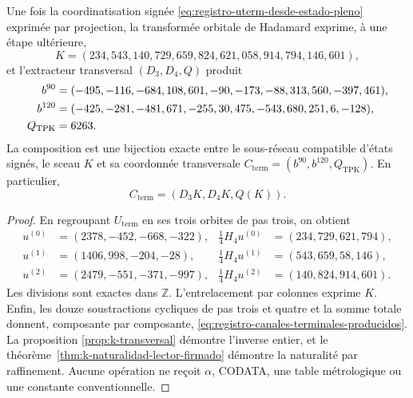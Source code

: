 \begin{theorem}
\label{thm:registro-evaluacion-terminal-recuperada}
Une fois la coordinatisation signée \eqref{eq:registro-uterm-desde-estado-pleno} exprimée par projection, la transformée orbitale de Hadamard exprime, à une étape ultérieure,
\[
 K=(234,543,140,729,659,824,621,058,914,794,146,601),
\]
et l’extracteur transversal \((D_3,D_4,Q)\) produit
\begin{align}
 b^{90}={}&(-495,-116,-684,108,601,-90,
             -173,-88,313,560,-397,461),\notag\\
 b^{120}={}&(-425,-281,-481,671,-255,30,
              475,-543,680,251,6,-128),\notag\\
 Q_{\mathrm{TPK}}={}&6263.
 \label{eq:registro-canales-terminales-producidos}
\end{align}
La composition est une bijection exacte entre le sous-réseau compatible d'états signés, le sceau \(K\) et sa coordonnée transversale \(C_{\mathrm{term}}=(b^{90},b^{120},Q_{\mathrm{TPK}})\). En particulier,
\begin{equation}
 C_{\mathrm{term}}=(D_3K,D_4K,Q(K)).
 \label{eq:registro-cterm-desde-xterm}
\end{equation}
\end{theorem}

\begin{proof}
En regroupant \(U_{\mathrm{term}}\) en ses trois orbites de pas trois, on obtient
\[
 \begin{aligned}
  u^{(0)}&=(2378,-452,-668,-322),&
  \tfrac14H_4u^{(0)}&=(234,729,621,794),\\
  u^{(1)}&=(1406,998,-204,-28),&
  \tfrac14H_4u^{(1)}&=(543,659,58,146),\\
  u^{(2)}&=(2479,-551,-371,-997),&
  \tfrac14H_4u^{(2)}&=(140,824,914,601).
 \end{aligned}
\]
Les divisions sont exactes dans \(\mathbb Z\). L'entrelacement par colonnes exprime \(K\). Enfin, les douze soustractions cycliques de pas trois et quatre et la somme totale donnent, composante par composante, \eqref{eq:registro-canales-terminales-producidos}. La proposition \ref{prop:k-transversal} démontre l'inverse entier, et le théorème~\ref{thm:k-naturalidad-lector-firmado} démontre la naturalité par raffinement. Aucune opération ne reçoit \(\alpha\), CODATA, une table métrologique ou une constante conventionnelle.
\end{proof}

